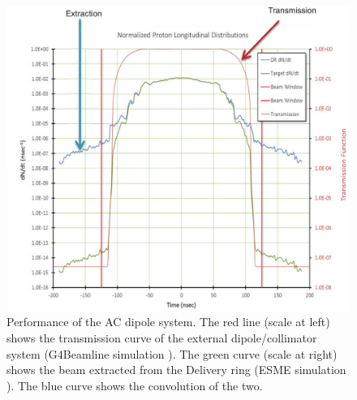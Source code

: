 \documentclass[12pt,a4paper,openright, oneside, titlepage]{book} %
\begin{document}
\begin{figure}[h!]
\centering
\includegraphics[scale=0.3]{Extinction}
\caption{Performance of the AC dipole system\cite{bob_mu2e}. The red line (scale at left) shows the transmission curve of the external dipole/collimator system (G4Beamline simulation \cite{G4beamline}). The green curve (scale at right) shows the beam extracted from the Delivery ring (ESME simulation \cite{ESME}). The blue curve shows the convolution of the two.}
\label{_Extinction}
\end{figure}
\end{document}
